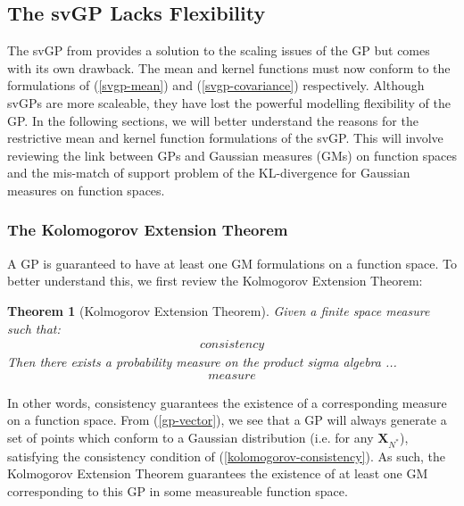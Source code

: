 \documentclass{article}
\newtheorem{theorem}{Theorem}
\numberwithin{equation}{section}
\begin{document}
\subsection{The svGP Lacks Flexibility}
The svGP from \cite{titsias2009variational} provides a solution to the scaling issues of the GP but comes with its own drawback. The mean and kernel functions must now conform to the formulations of (\ref{svgp-mean}) and (\ref{svgp-covariance}) respectively. Although svGPs are more scaleable, they have lost the powerful modelling flexibility of the GP. In the following sections, we will better understand the reasons for the restrictive mean and kernel function formulations of the svGP. This will involve reviewing the link between GPs and Gaussian measures (GMs) on function spaces and the mis-match of support problem of the KL-divergence for Gaussian measures on function spaces. 

\subsubsection{The Kolomogorov Extension Theorem}
A GP is guaranteed to have at least one GM formulations on a function space. To better understand this, we first review the Kolmogorov Extension Theorem:
\begin{theorem}[Kolmogorov Extension Theorem]
\label{kolomogorov-extension-theorem}
Given a finite space measure such that:
\begin{align}
    consistency 
    \label{kolomogorov-consistency}
\end{align}
Then there exists a probability measure on the product sigma algebra ... 
\begin{align}
    measure
    \label{kolomogorov-measure}
\end{align}
\end{theorem}
In other words, consistency guarantees the existence of a corresponding measure on a function space. From (\ref{gp-vector}), we see that a GP will always generate a set of points which conform to a Gaussian distribution (i.e. for any $\mathbf{X}_{N^*}$), satisfying the consistency condition of (\ref{kolomogorov-consistency}). As such, the Kolmogorov Extension Theorem guarantees the existence of at least one GM corresponding to this GP in some measureable function space. 
\end{document}
